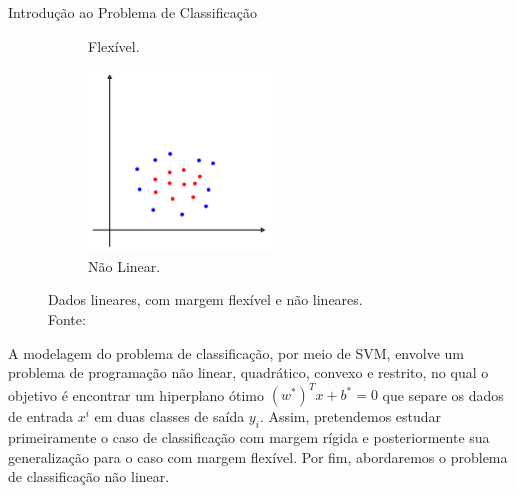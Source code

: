 \documentclass[12pt]{beamer}
\theoremstyle{definition}%
\begin{document}
\begin{frame}{Introdução ao Problema de Classificação}
\begin{figure}[!h]
\begin{subfigure}[!h]{0.3\textwidth}
		\caption{Flexível. \label{fig1:b}}
	\end{subfigure}
	\begin{subfigure}[!h]{0.3\textwidth}
		\centering
		\includegraphics[width=\textwidth]{SVM_naolinear}
		\caption{Não Linear. \label{fig1:c}}
	\end{subfigure}
	\caption{Dados lineares, com margem flexível e não lineares. \label{fig1}\\ Fonte: \textcite{Evelin2017}}
\end{figure}
\end{frame}


\begin{frame}
A modelagem do problema de classificação, por meio de SVM, envolve um problema de programação não linear, quadrático, convexo e restrito, no qual o objetivo é encontrar um hiperplano ótimo $(w^{*})^{T}x+b^{*}=0$ que separe os dados de entrada $x^{i}$ em duas classes de saída $y_{i}$. Assim, pretendemos estudar primeiramente o caso de classificação com margem rígida e posteriormente sua generalização para o caso com margem flexível. Por fim, abordaremos o problema de classificação não linear. 
\end{frame}
\end{document}
